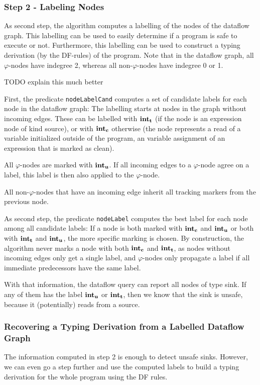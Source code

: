 \subsubsection*{Step 2 - Labeling Nodes}
As second step, the algorithm computes a labelling of the nodes of the dataflow graph.
This labelling can be used to easily determine if a program is safe to execute or not.
Furthermore, this labelling can be used to construct a typing derivation (by the DF-rules)
of the program.
Note that in the dataflow graph, all $\varphi$-nodes have indegree 2, whereas all
non-$\varphi$-nodes have indegree 0 or 1.

TODO explain this much better

First, the predicate \texttt{nodeLabelCand} computes a set of candidate labels 
for each node in the dataflow graph:
The labelling starts at nodes in the graph without incoming edges.
These can be labelled with $\textbf{int}_\textbf{t}$ (if the node is an expression node of kind source),
or with $\textbf{int}_\textbf{c}$ otherwise (the node represents a read of a variable initialized outside
of the program, an variable assignment of an expression that is marked as clean).

All $\varphi$-nodes are marked with $\textbf{int}_\textbf{u}$.
If all incoming edges to a $\varphi$-node agree on a label, this label is then
also applied to the $\varphi$-node.

All non-$\varphi$-nodes that have an incoming edge inherit all tracking markers from
the previous node.

As second step, the predicate \texttt{nodeLabel} computes the best label for each node 
among all candidate labels:
If a node is both marked with $\textbf{int}_\textbf{c}$ and $\textbf{int}_\textbf{u}$ or both with $\textbf{int}_\textbf{t}$
and $\textbf{int}_\textbf{u}$, the more specific marking is chosen.
By construction, the algorithm never marks a node with both $\textbf{int}_\textbf{c}$ and $\textbf{int}_\textbf{t}$,
as nodes without incoming edges only get a single label, and $\varphi$-nodes only 
propagate a label if all immediate predecessors have the same label.

With that information, the dataflow query can report all nodes of type sink.
If any of them has the label $\textbf{int}_\textbf{u}$ or $\textbf{int}_\textbf{t}$, then we know that the sink
is unsafe, because it (potentially) reads from a source.

\subsubsection*{Recovering a Typing Derivation from a Labelled Dataflow Graph}
The information computed in step 2 is enough to detect unsafe sinks.
However, we can even go a step further and use the computed labels to build a
typing derivation for the whole program using the DF rules.

